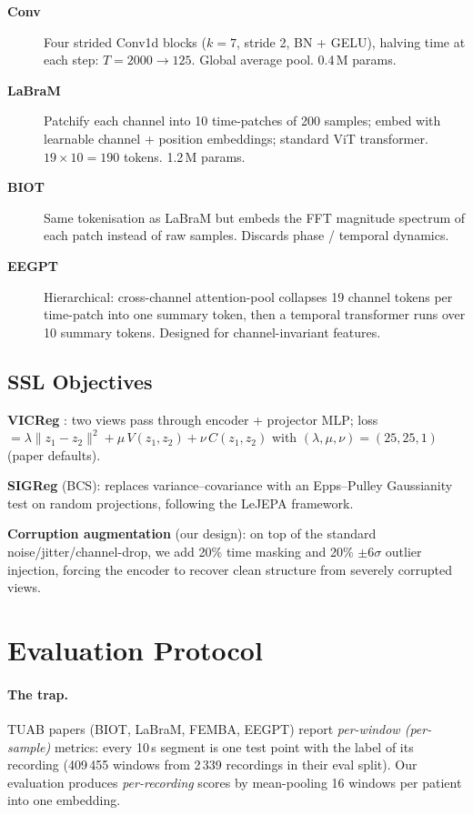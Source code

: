 \documentclass[10pt,a4paper]{article}
\begin{document}
\begin{description}
  \item[\textbf{Conv}] Four strided Conv1d blocks ($k=7$, stride 2, BN + GELU),
    halving time at each step: $T=2000 \to 125$. Global average pool. 0.4\,M params.
  \item[\textbf{LaBraM}] Patchify each channel into 10 time-patches of 200 samples;
    embed with learnable channel + position embeddings; standard ViT transformer.
    $19 \times 10 = 190$ tokens. 1.2\,M params.
  \item[\textbf{BIOT}] Same tokenisation as LaBraM but embeds the FFT magnitude
    spectrum of each patch instead of raw samples. Discards phase / temporal dynamics.
  \item[\textbf{EEGPT}] Hierarchical: cross-channel attention-pool collapses
    19 channel tokens per time-patch into one summary token, then a temporal
    transformer runs over 10 summary tokens. Designed for channel-invariant features.
\end{description}

\subsection{SSL Objectives}
\textbf{VICReg} \cite{bardes2022vicreg}: two views pass through encoder + projector MLP;
loss $= \lambda\|z_1-z_2\|^2 + \mu\,V(z_1,z_2) + \nu\,C(z_1,z_2)$
with $(\lambda,\mu,\nu)=(25,25,1)$ (paper defaults).

\textbf{SIGReg} (BCS): replaces variance–covariance with an Epps–Pulley Gaussianity
test on random projections, following the LeJEPA framework.

\textbf{Corruption augmentation} (our design): on top of the standard noise/jitter/channel-drop,
we add 20\% time masking and 20\% $\pm6\sigma$ outlier injection, forcing the encoder to recover
clean structure from severely corrupted views.

\section{Evaluation Protocol}\label{sec:eval_trap}

\paragraph{The trap.}
TUAB papers (BIOT, LaBraM, FEMBA, EEGPT) report \emph{per-window (per-sample)} metrics:
every 10\,s segment is one test point with the label of its recording (409\,455 windows from
2\,339 recordings in their eval split). Our evaluation produces \emph{per-recording} scores
by mean-pooling 16 windows per patient into one embedding.
\end{document}
